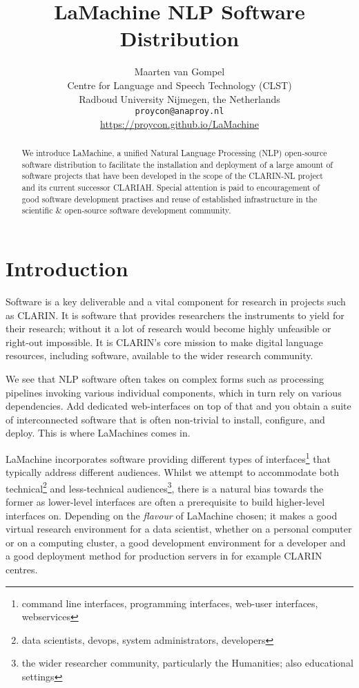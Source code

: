 \documentclass[a4paper,11pt]{article}
\title{LaMachine NLP Software Distribution}
\author{Maarten van Gompel \\
  Centre for Language and Speech Technology (CLST) \\
  Radboud University Nijmegen, the Netherlands \\
  {\tt proycon@anaproy.nl} \\ %
  \url{https://proycon.github.io/LaMachine}
}
\date{}
\begin{document}
\maketitle

\begin{abstract}
We introduce LaMachine, a unified Natural Language Processing (NLP) open-source software distribution to facilitate the
installation and deployment of a large amount of software projects that have been developed in the scope of the
CLARIN-NL project and its current successor CLARIAH. Special attention is paid to encouragement of good software
development practises and reuse of established infrastructure in the scientific \& open-source software development
community.
\end{abstract}

\section{Introduction} \label{intro}

Software is a key deliverable and a vital component for research in projects such as CLARIN. It is software that
provides researchers the instruments to yield for their research; without it a lot of research would become highly
unfeasible or right-out impossible. It is CLARIN's core mission to make digital language resources, including software,
available to the wider research community.

We see that NLP software often takes on complex forms such as processing pipelines invoking various individual
components, which in turn rely on various dependencies. Add dedicated web-interfaces on top of that and you obtain a
suite of interconnected software that is often non-trivial to install, configure, and deploy. This is where LaMachines
comes in.

LaMachine incorporates software providing different types of interfaces\footnote{command line interfaces, programming
interfaces, web-user interfaces, webservices} that typically address different audiences. Whilst we attempt to
accommodate both technical\footnote{data scientists, devops, system administrators, developers} and less-technical
audiences\footnote{the wider researcher community, particularly the Humanities; also educational settings}, there is a natural bias towards the former as
lower-level interfaces are often a prerequisite to build higher-level interfaces on. Depending on the \emph{flavour} of
LaMachine chosen; it makes a good virtual research environment for a data scientist, whether on a personal computer or on a computing
cluster, a good development environment for a developer and a good deployment method for production servers in for
example CLARIN centres.
\end{document}
